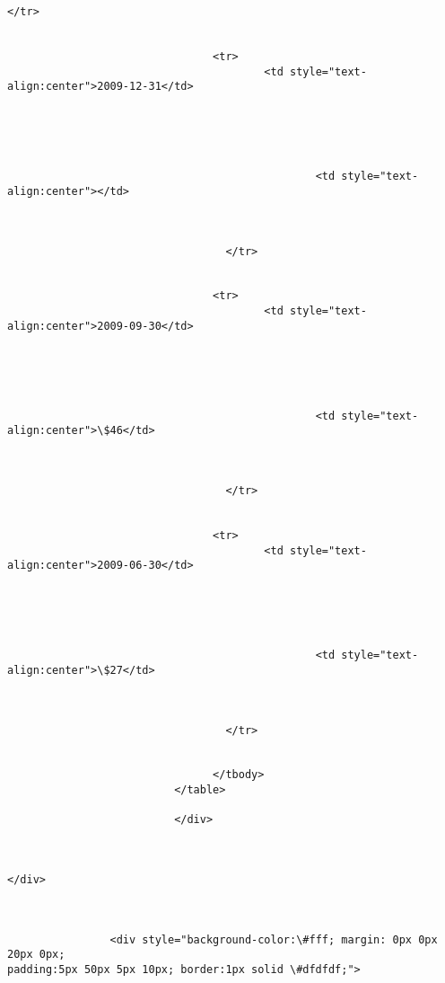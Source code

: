 \documentclass[11pt]{article}
\begin{document}
\begin{Verbatim}[commandchars=\\\{\}]
                                  </tr>


                                <tr>
                                        <td style="text-
align:center">2009-12-31</td>





                                                <td style="text-
align:center"></td>



                                  </tr>


                                <tr>
                                        <td style="text-
align:center">2009-09-30</td>





                                                <td style="text-
align:center">\$46</td>



                                  </tr>


                                <tr>
                                        <td style="text-
align:center">2009-06-30</td>





                                                <td style="text-
align:center">\$27</td>



                                  </tr>


                                </tbody>
                          </table>

                          </div>



</div>



                <div style="background-color:\#fff; margin: 0px 0px 20px 0px;
padding:5px 50px 5px 10px; border:1px solid \#dfdfdf;">


\end{Verbatim}
\end{document}
